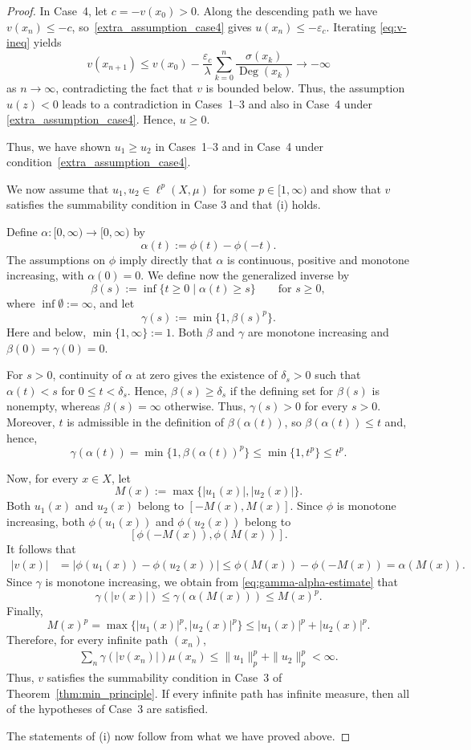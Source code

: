 \documentclass[letterpaper]{article}
\theoremstyle{definition}
\theoremstyle{named}
\numberwithin{equation}{section}
\newcommand{\Deg}{\operatorname{Deg}}
\begin{document}
\begin{proof}
{In Case~4, let $c=-v(x_0)>0$. Along the descending path we have
$v(x_n)\leq-c$, so~\eqref{extra_assumption_case4} gives
$u(x_n)\leq-\varepsilon_c$. Iterating
\eqref{eq:v-ineq} yields
\[
 v(x_{n+1})
 \leq v(x_0)-\frac{\varepsilon_c}{\lambda}
 \sum_{k=0}^n\frac{\sigma(x_k)}{\Deg(x_k)}
 \to -\infty
\]
as $n \to \infty$, contradicting the fact that $v$ is bounded below.
Thus, the assumption $u(z)<0$ leads to a contradiction in Cases~1--3
and also in Case~4 under \eqref{extra_assumption_case4}. Hence, $u\geq0$.
}
{ Thus, we have shown $u_1\geq u_2$ in Cases~1--3 and in
Case~4 under condition~\eqref{extra_assumption_case4}.

We now assume that $u_1,u_2 \in \ell^p(X,\mu)$ for some $p \in [1,\infty)$
and show that $v$ satisfies the summability condition in Case 3 and that (i) holds.}
{
Define $\alpha\colon[0,\infty)\to[0,\infty)$ by
\[
 \alpha(t):=\phi(t)-\phi(-t).
\]
The assumptions on $\phi$ imply directly that $\alpha$ is continuous,
positive and monotone increasing, with $\alpha(0)=0$.
We define now the generalized  inverse by
\[
 \beta(s):=\inf\{t\geq0 \mid \alpha(t)\geq s\}
 \qquad \text{for } s\geq0,
\]
where $\inf\emptyset:=\infty$, and let
\[
 \gamma(s):=\min\{1,\beta(s)^p\}.
\]
Here and below, $\min\{1,\infty\}:=1$. Both $\beta$ and $\gamma$ are
monotone increasing and $\beta(0)=\gamma(0)=0$.

For $s>0$, continuity of $\alpha$ at zero gives the existence of $\delta_s>0$ such that
$\alpha(t)<s$ for $0\leq t<\delta_s$. Hence, $\beta(s)\geq\delta_s$ if
the defining set for $\beta(s)$ is nonempty, whereas $\beta(s)=\infty$
otherwise. Thus, $\gamma(s)>0$ for every $s>0$. Moreover, $t$ is
admissible in the definition of $\beta(\alpha(t))$, so
$\beta(\alpha(t))\leq t$ and, hence,
\begin{equation}\label{eq:gamma-alpha-estimate}
 \gamma(\alpha(t))
 =
 \min\{1,\beta(\alpha(t))^p\}
 \leq\min\{1,t^p\}
 \leq t^p.
\end{equation}

Now, for every $x\in X$, let
\[
 M(x):=\max\{|u_1(x)|,|u_2(x)|\}.
\]
Both $u_1(x)$ and $u_2(x)$ belong to $[-M(x),M(x)]$. Since $\phi$ is
monotone increasing, both $\phi(u_1(x))$ and $\phi(u_2(x))$ belong to
\[
 [\phi(-M(x)),\phi(M(x))].
\]
It follows that
\begin{align*}
 |v(x)|
 &=
 |\phi(u_1(x))-\phi(u_2(x))|\leq
 \phi(M(x))-\phi(-M(x))
 =
 \alpha(M(x)).
\end{align*}
Since $\gamma$ is monotone increasing, we obtain from
\eqref{eq:gamma-alpha-estimate} that
\[
 \gamma(|v(x)|)
 \leq
 \gamma(\alpha(M(x)))
 \leq
 M(x)^p.
\]
Finally,
\[
 M(x)^p
 =
 \max\{|u_1(x)|^p,|u_2(x)|^p\}
 \leq
 |u_1(x)|^p+|u_2(x)|^p.
\]
Therefore, for every infinite path $(x_n)$,
\begin{align*}
 \sum_n\gamma(|v(x_n)|)\mu(x_n)
 \leq
 \|u_1\|_p^p+\|u_2\|_p^p
 <\infty.
\end{align*}
Thus, $v$ satisfies the summability condition in Case~3 of
Theorem~\ref{thm:min_principle}. If every infinite path has infinite
measure, then all of the hypotheses of Case~3 are satisfied.
{ The statements of (i) now follow from what we have proved above.

}}
\end{proof}
\end{document}
